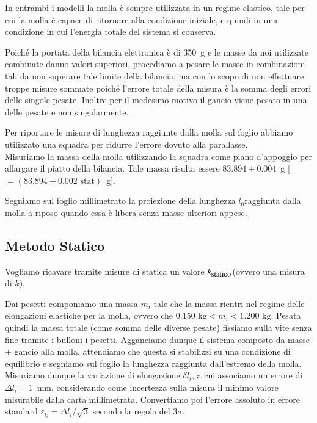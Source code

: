 \documentclass[italian, a4paper, 10pt, twocolumn]{../../style/lab_unige}
\newcommand{\ks}{$k_{\text{\small statico}}$\space}
\newcommand{\treSigma}{$3\sigma$\space}
\newcommand{\Lo}{$l_0$\space}
\newcommand{\MassI}[1]{$m_{#1}$}
\begin{document}
    In entrambi i modelli la molla è sempre utilizzata in un regime elastico, tale per cui la molla è capace
    di ritornare alla condizione iniziale, e quindi in una condizione in cui l'energia totale del sistema si 
    conserva.

    Poiché la portata della bilancia elettronica è di 350~g e le masse da noi utilizzate combinate danno valori
    superiori, procediamo a pesare le masse in combinazioni tali da non superare tale limite della bilancia, 
    ma con lo scopo di non effettuare troppe misure sommate poiché l'errore totale della misura è la somma degli
    errori delle singole pesate. Inoltre per il medesimo motivo il gancio viene pesato in una delle pesate e 
    non singolarmente.

    Per riportare le misure di lunghezza raggiunte dalla molla sul foglio abbiamo utilizzato una squadra per 
    ridurre l'errore dovuto alla parallasse.\\

    Misuriamo la massa della molla utilizzando la squadra come piano d'appoggio per allargare il piatto della 
    bilancia. Tale massa risulta essere $83.894\pm0.004$~g [$= (83.894\pm0.002\text{ stat})$~g].

    Segniamo sul foglio millimetrato la proiezione della lunghezza \Lo raggiunta dalla molla a riposo quando 
    essa è libera senza masse ulteriori appese. 

    \subsection{Metodo Statico}
    \label{subsec:methods_stat}
    Vogliamo ricavare tramite misure di statica un valore \ks (ovvero una misura di $k$).

    Dai pesetti componiamo una massa \MassI{i} tale che la massa rientri nel regime delle elongazioni elastiche 
    per la molla, ovvero che  $0.150 \text{ kg} < m_i < 1.200 \text{ kg}$. 
    Pesata quindi la massa totale (come somma delle diverse pesate) fissiamo sulla vite senza fine tramite i 
    bulloni i pesetti. Agganciamo dunque il sistema composto da masse + gancio alla molla, attendiamo che questa 
    si stabilizzi su una condizione di equilibrio e segniamo sul foglio la lunghezza raggiunta dall'estremo della 
    molla.
    Misuriamo dunque la variazione di elongazione $\delta l_i$, a cui associamo un errore di $\Delta l_i=$1~mm, 
    considerando come incertezza sulla misura il minimo valore misurabile dalla carta millimetrata. Convertiamo 
    poi l'errore assoluto in errore standard $\varepsilon_{l_i} = \Delta l_i /\sqrt{3}$ secondo la regola del 
    \treSigma.
    
\end{document}
